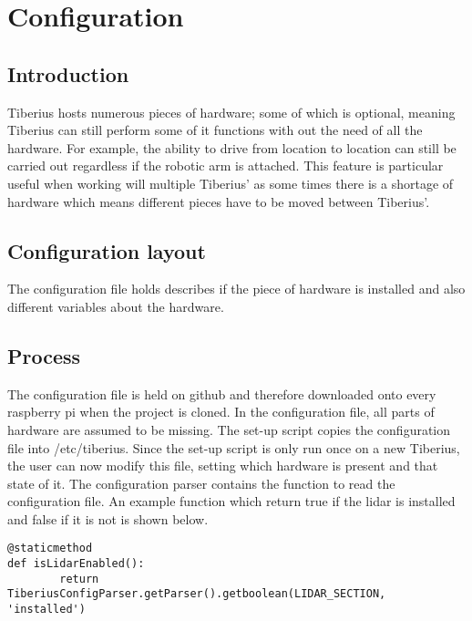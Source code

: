 \section{Configuration}
\pagestyle{aidan}
\label{configuration}
\subsection{Introduction}
Tiberius hosts numerous pieces of hardware; some of which is optional, meaning Tiberius can still perform some of it functions with out the need of all the hardware. For example, the ability to drive from location to location can still be carried out regardless if the robotic arm is attached.  
\newline
This feature is particular useful when working will multiple Tiberius' as some times there is a shortage of hardware which means different pieces have to be moved between Tiberius'.

\subsection{Configuration layout}
The configuration file holds describes if the piece of hardware is installed and also different variables about the hardware. 

\subsection{Process}
The configuration file is held on github and therefore downloaded onto every raspberry pi when the project is cloned. In the configuration file, all parts of hardware are assumed to be missing. 
The set-up script copies the configuration file into /etc/tiberius. Since the set-up script is only run once on a new Tiberius, the user can now modify this file, setting which hardware is present and that state of it. 
\newline
The configuration parser contains the function to read the configuration file. An example function which return true if the lidar is installed and false if it is not is shown below.
\begin{lstlisting}[style=custompython]
@staticmethod
def isLidarEnabled():
        return TiberiusConfigParser.getParser().getboolean(LIDAR_SECTION, 'installed')
\end{lstlisting} 
